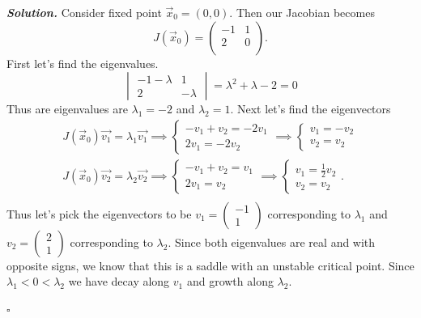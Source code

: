 \documentclass[12pt]{report}
\newenvironment{solution}[1][\it{Solution}]{\textbf{#1. } }{$\square$}
\begin{document}
\begin{solution}
    \noindent 
    Consider fixed point $\vec{x}_0 = (0,0)$. Then our Jacobian becomes
    \[ J(\vec{x}_0) = \left(
        \begin{array}{cc}
         -1 & 1 \\
         2 & 0 \\
        \end{array}
        \right).
    \]
    First let's find the eigenvalues.
    \[ 
        \begin{vmatrix}
            -1 - \lambda & 1\\
            2 & -\lambda
        \end{vmatrix} = \lambda^2 + \lambda - 2 = 0
    \]
    Thus are eigenvalues are $\lambda_1 = -2$ and $\lambda_2 = 1$.  Next let's find the eigenvectors
    \begin{align*}
        J(\vec{x}_0)\vec{v_1} = \lambda_1 \vec{v_1} \implies \begin{cases}
            -v_1 + v_2 = -2v_1\\
            2v_1 = -2v_2
        \end{cases} \implies
        \begin{cases}
            v_1 = -v_2\\
            v_2 = v_2
        \end{cases}\\
        J(\vec{x}_0)\vec{v_2} = \lambda_2 \vec{v_2} \implies \begin{cases}
            -v_1 + v_2 = v_1\\
            2v_1 = v_2
        \end{cases} \implies
        \begin{cases}
            v_1 = \frac{1}{2}v_2\\
            v_2 = v_2
        \end{cases}.\\
    \end{align*}
    Thus let's pick the eigenvectors to be $v_1 = \begin{pmatrix}
        -1\\1
    \end{pmatrix}$ corresponding to $\lambda_1$ and $v_2 = \begin{pmatrix}
        2\\1
    \end{pmatrix}$ corresponding to $\lambda_2$. Since both eigenvalues are real and with opposite signs, we know that this is a saddle with an unstable critical point. Since $\lambda_1 < 0 < \lambda_2$ we have decay along $v_1$ and growth along $\lambda_2$.



\end{solution}
\end{document}
